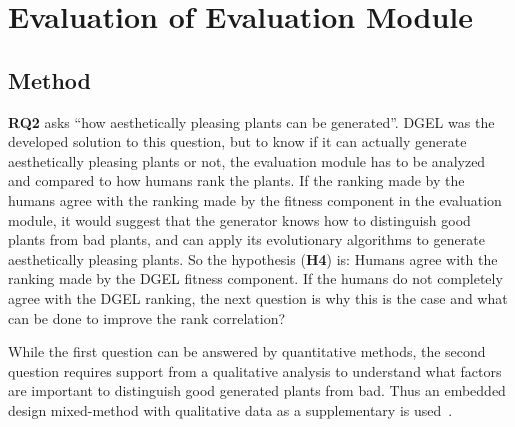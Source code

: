\section{Evaluation of Evaluation Module}
\subsection{Method}
\textbf{RQ2} asks ``how aesthetically pleasing plants can be generated''.
\gls{DGEL} was the developed solution to this question, but to know if it can actually generate aesthetically pleasing plants or not, the evaluation module has to be analyzed and compared to how humans rank the plants.
If the ranking made by the humans agree with the ranking made by the fitness component in the evaluation module, it would suggest that the generator knows how to distinguish good plants from bad plants, and can apply its evolutionary algorithms to generate aesthetically pleasing plants.
So the hypothesis (\textbf{H4}) is: Humans agree with the ranking made by the \gls{DGEL} fitness component.
If the humans do not completely agree with the \gls{DGEL} ranking, the next question is why this is the case and what can be done to improve the rank correlation?

While the first question can be answered by quantitative methods, the second question requires support from a qualitative analysis to understand what factors are important to distinguish good generated plants from bad.
Thus an embedded design mixed-method with qualitative data as a supplementary is used~\cite{PracticalResearch}.

